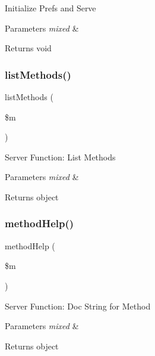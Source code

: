 Initialize Prefs and Serve


\begin{DoxyParams}{Parameters}
{\em mixed} & \\
\hline
\end{DoxyParams}
\begin{DoxyReturn}{Returns}
void 
\end{DoxyReturn}
\mbox{\label{class_c_i___xmlrpcs_ad640f0b44d1956a05cfe40bab4e4043d}} 
\subsubsection{\texorpdfstring{list\+Methods()}{listMethods()}}
{\footnotesize\ttfamily list\+Methods (\begin{DoxyParamCaption}\item[{}]{\$m }\end{DoxyParamCaption})}

Server Function\+: List Methods


\begin{DoxyParams}{Parameters}
{\em mixed} & \\
\hline
\end{DoxyParams}
\begin{DoxyReturn}{Returns}
object 
\end{DoxyReturn}
\mbox{\label{class_c_i___xmlrpcs_a97626f30e860f4a63463f8674827dc00}} 
\subsubsection{\texorpdfstring{method\+Help()}{methodHelp()}}
{\footnotesize\ttfamily method\+Help (\begin{DoxyParamCaption}\item[{}]{\$m }\end{DoxyParamCaption})}

Server Function\+: Doc String for Method


\begin{DoxyParams}{Parameters}
{\em mixed} & \\
\hline
\end{DoxyParams}
\begin{DoxyReturn}{Returns}
object 
\end{DoxyReturn}
\mbox{\label{class_c_i___xmlrpcs_a9f96cc0bd3338094174eb22cd90d6f2a}} 
